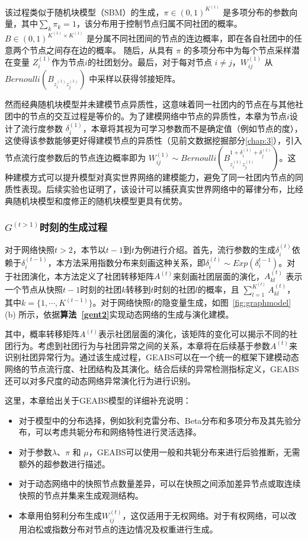 该过程类似于随机块模型（SBM）的生成，$\pi \in (0,1)^{K^{(1)}}$ 是多项分布的参数向量，其中$\sum_k \pi_k =1$，该分布用于控制节点归属不同社团的概率。$B \in (0,1)^{K^{(1)} \times K^{(1)}}$ 是分属不同社团间的节点的连边概率，即在各自社团中的任意两个节点之间存在边的概率。
随后，从具有 $\pi$ 的多项分布中为每个节点采样潜在变量 $Z_i^{(1)}$作为节点$i$的社团划分。最后，对于每对节点 $i \ne j$，$W^{(1)}_{ij}$ 从 $Bernoulli(B_{z_i^{(1)} z_j^{(1)}})$ 中采样以获得邻接矩阵。

然而经典随机块模型并未建模节点异质性，这意味着同一社团内的节点在与其他社团中的节点的交互过程是等价的。为了建模网络中节点的异质性，本章为节点$i$设计了流行度参数 $\delta^{(1)}_i$，本章将其视为可学习参数而不是确定值（例如节点的度），这使得该参数能够更好得建模节点的异质性（见前文数据挖掘部分\ref{chap:3}），引入节点流行度参数后的节点连边概率即为 $W^{(1)}_{ij} \sim Bernoulli\left(B_{z_i^{(1)} z_j^{(1)}}^{1+\delta_i^{(1)} + \delta_j^{(1)}}\right)$。这种建模方式可以提升模型对真实世界网络的建模能力，避免了同一社团内节点的同质性表现。后续实验也证明了，该设计可以捕获真实世界网络中的幂律分布，比经典随机块模型和度修正的随机块模型更具有优势。

\subsubsection{$G^{(t>1)}$时刻的生成过程}

对于网络快照$t > 2$，本节以$t-1$到$t$为例进行介绍。首先，流行参数的生成$\delta_i^{(t)}$依赖于$\delta_i^{(t-1)}$，本方法采用指数分布来刻画这种关系，即$\delta_i^{(t)} \sim Exp(\delta_i^{t-1})$。对于社团演化，本方法定义了社团转移矩阵$A^{(t)}$来刻画社团层面的演化，$A^{(t)}_{kl}$ 表示一个节点从快照$t-1$时刻的社团$k$转移到$t$时刻的社团$l$的概率，且 $\sum_{l=1}^{K^{(t)}}A^{(t)}_{kl}$，其中$k =\{1, \cdots, K^{(t-1)}\}$。对于网络快照$t$的隐变量生成，如图~\ref{fig:graphmodel} (b) 所示，依据\textbf{算法~\ref{gent2}}实现动态网络的生成与演化建模。

其中，概率转移矩阵$A^{(t)}$表示社团层面的演化，该矩阵的变化可以揭示不同的社团行为。考虑到社团行为与社团异常之间的关系，本章将在后续基于参数$A^{(t)}$来识别社团异常行为。通过该生成过程，GEABS可以在一个统一的框架下建模动态网络的节点流行度、社团结构及其演化。结合后续的异常检测指标定义，GEABS还可以对多尺度的动态网络异常演化行为进行识别。

这里，本章给出关于GEABS模型的详细补充说明：
\begin{itemize}
    \item 对于模型中的分布选择，例如狄利克雷分布、Beta分布和多项分布及其先验分布，可以考虑共轭分布和网络特性进行灵活选择。
    \item  对于参数$\lambda$、$\pi$ 和 $\mu$，GEABS可以使用一般和共轭分布来进行后验推断，无需额外的超参数进行描述。
    \item  对于动态网络中的快照节点数量差异，可以在快照之间添加差异节点或取连续快照的节点并集来生成观测结构。
    \item  本章用伯努利分布生成$W^{(t)}_{ij}$，这仅适用于无权网络。对于有权网络，可以改用泊松或指数分布对节点的连边情况及权重进行生成。
\end{itemize}

